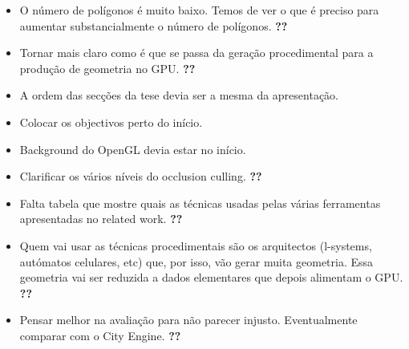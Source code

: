 \begin{itemize}
	\item O número de polígonos é muito baixo. Temos de ver o que é preciso para aumentar substancialmente o número de polígonos. \textbf{??}

	\item Tornar mais claro como é que se passa da geração procedimental para a produção de geometria no GPU. \textbf{??}
	
	\item A ordem das secções da tese devia ser a mesma da apresentação. \Checkmark

	\item Colocar os objectivos perto do início. \Checkmark

	\item Background do OpenGL devia estar no início. \Checkmark

	\item Clarificar os vários níveis do occlusion culling. \textbf{??}

	\item Falta tabela que mostre quais as técnicas usadas pelas várias ferramentas apresentadas no related work. \textbf{??}

	\item Quem vai usar as técnicas procedimentais são os arquitectos (l-systems, autómatos celulares, etc) que, por isso, vão gerar muita geometria. Essa geometria vai ser reduzida a dados elementares que depois alimentam o GPU. \Checkmark \textbf{??}

	\item Pensar melhor na avaliação para não parecer injusto. Eventualmente comparar com o City Engine. \textbf{??}
\end{itemize}
